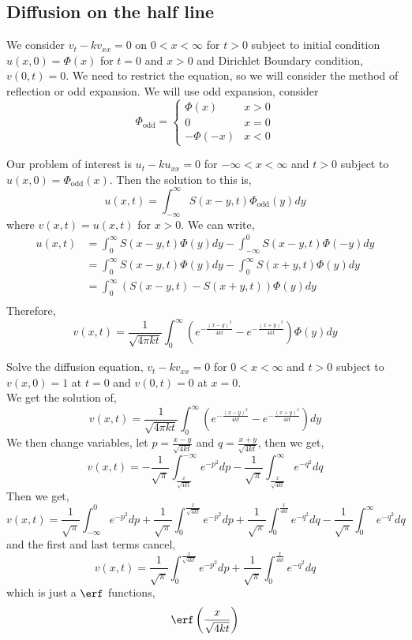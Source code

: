 \subsection{Diffusion on the half line}
We consider $v_t - kv_{xx} = 0$ on $0 < x < \infty$ for $t > 0$ subject to initial condition $u(x, 0) = \Phi(x)$ for $t = 0$ and $x > 0$ and Dirichlet Boundary condition, $v(0, t) = 0$. We need to restrict the equation, so we will consider the method of reflection or odd expansion. We will use odd expansion, consider $$\Phi_\text{odd} = \begin{cases}
  \Phi(x) & x > 0 \\
  0 & x = 0 \\
  -\Phi(-x) & x < 0
\end{cases}$$

Our problem of interest is $u_t - ku_{xx} = 0$ for $- \infty < x < \infty$ and $t > 0$ subject to $u(x, 0) = \Phi_\text{odd}(x)$. Then the solution to this is,
$$ u(x, t) = \int_{-\infty}^\infty S(x - y, t)\Phi_\text{odd}(y)dy $$
where $v(x, t) = u(x, t)$ for $x > 0$. We can write,
\begin{align*}
  u(x, t) &= \int_0^\infty S(x - y, t)\Phi(y)dy - \int_{-\infty}^0 S(x - y, t)\Phi(-y)dy \\
  &= \int_0^\infty S(x - y, t)\Phi(y)dy - \int^{\infty}_0 S(x + y, t)\Phi(y)dy \\
  &= \int_0^\infty \left(S(x - y, t) - S(x + y, t)\right)\Phi(y)dy \\
\end{align*}
Therefore,
$$ v(x, t) = \frac{1}{\sqrt{4\pi kt}}\int_0^\infty \left(e^{-\frac{(x - y)^2}{4kt}} - e^{-\frac{(x + y)^2}{4kt}}\right) \Phi(y)dy $$
\begin{eg}
  Solve the diffusion equation, $v_t - kv_{xx} = 0$ for $0 < x < \infty$ and $t > 0$ subject to $v(x, 0) = 1$ at $t = 0$ and $v(0, t) = 0$ at $x = 0$.\\

  \noindent
  We get the solution of,
  $$ v(x, t) = \frac{1}{\sqrt{4\pi kt}}\int_0^\infty \left(e^{-\frac{(x - y)^2}{4kt}} - e^{-\frac{(x + y)^2}{4kt}}\right) dy $$
  We then change variables, let $p = \frac{x - y}{\sqrt{4kt}}$ and $q = \frac{x + y}{\sqrt{4kt}}$, then we get,
  $$ v(x, t) = -\frac{1}{\sqrt{\pi }}\int_{\frac{x}{\sqrt{4kt}}}^{-\infty} e^{-p^2} dp - \frac{1}{\sqrt{\pi}}\int_{\frac{x}{\sqrt{4kt}}}^{\infty} e^{-q^2} dq $$
  Then we get,
  $$ v(x, t) = \frac{1}{\sqrt \pi}\int_{-\infty}^0 e^{-p^2}dp + \frac{1}{\sqrt \pi}\int_0^{\frac{x}{\sqrt{4kt}}}e^{-p^2}dp + \frac{1}{\sqrt \pi}\int^{\frac{x}{4kt}}_0 e^{-q^2}dq - \frac{1}{\sqrt\pi} \int_0^\infty e^{-q^2}dq $$
  and the first and last terms cancel,
  $$ v(x, t) = \frac{1}{\sqrt \pi}\int_0^{\frac{x}{\sqrt{4kt}}}e^{-p^2}dp + \frac{1}{\sqrt \pi}\int^{\frac{x}{4kt}}_0 e^{-q^2}dq $$
  which is just a $\erf$ functions,
  $$ \erf \left(\frac{x}{\sqrt{4kt}}\right) $$
\end{eg}

